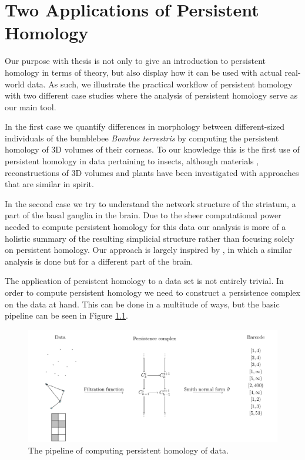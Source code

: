 \chapter{Two Applications of Persistent Homology}

Our purpose with thesis is not only to give an introduction to persistent homology in terms of theory, but also display how it can be used with actual real-world data. As such, we illustrate the practical workflow of persistent homology with two different case studies where the analysis of persistent homology serve as our main tool.

In the first case we quantify differences in morphology between different-sized individuals of the bumblebee \textit{Bombus terrestris} by computing the persistent homology of 3D volumes of their corneas. To our knowledge this is the first use of persistent homology in data pertaining to insects, although materials \cite{moon2019, delgadofriedrichs2014}, reconstructions of 3D volumes \cite{gutierrez2012, gutierrez2014} and plants \cite{plants} have been investigated with approaches that are similar in spirit.

In the second case we try to understand the network structure of the striatum, a part of the basal ganglia in the brain. Due to the sheer computational power needed to compute persistent homology for this data our analysis is more of a holistic summary of the resulting simplicial structure rather than focusing solely on persistent homology. Our approach is largely inspired by \cite{reimann}, in which a similar analysis is done but for a different part of the brain.

The application of persistent homology to a data set is not entirely trivial. In order to compute persistent homology we need to construct a persistence complex on the data at hand. This can be done in a multitude of ways, but the basic pipeline can be seen in Figure \ref{pipeline}.

\begin{figure}[h]
  \centering
  \includegraphics[scale=0.8]{pipeline.pdf}
  \caption{\label{pipeline} The pipeline of computing persistent homology of data.}
\end{figure}

